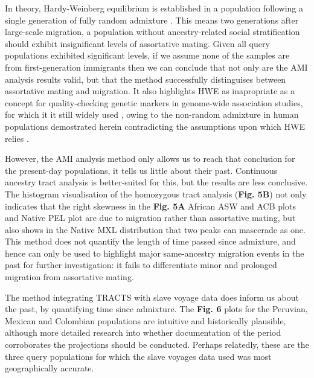 \documentclass[11pt]{article}
\begin{document}
In theory, Hardy-Weinberg equilibrium is established in a population following a single generation of fully random admixture \parencite{Smithjohn2015}. This means two generations after large-scale migration, a population without ancestry-related social stratification should exhibit insignificant levels of assortative mating. Given all query populations exhibited significant levels, if we assume none of the samples are from first-generation immigrants then we can conclude that not only are the AMI analysis results valid, but that the method successfully distinguises between assortative mating and migration. It also highlights HWE as inapropriate as a concept for quality-checking genetic markers in genome-wide association studies, for which it it still widely used \parencite{Linares-Pineda2012}, owing to the non-random admixture in human populations demostrated herein contradicting the assumptions upon which HWE relies \parencite{Smithjohn2015}.

However, the AMI analysis method only allows us to reach that conclusion for the present-day populations, it tells us little about their past. Continuous ancestry tract analysis is better-suited for this, but the results are less conclusive. The histogram visualisation of the homozygous tract analysis (\textbf{Fig. 5B}) not only indicates that the right skewness in the \textbf{Fig. 5A} African ASW and ACB plots and Native PEL plot are due to migration rather than assortative mating, but also shows in the Native MXL distribution that two peaks can mascerade as one. This method does not quantify the length of time passed since admixture, and hence can only be used to highlight major same-ancestry migration events in the past for further investigation: it fails to differentiate minor and prolonged migration from assortative mating. 

The method integrating TRACTS with slave voyage data does inform us about the past, by quantifying time since admixture. The \textbf{Fig. 6} plots for the Peruvian, Mexican and Colombian populations are intuitive and historically plausible, although more detailed research into whether documentation of the period corroborates the projections should be conducted. Perhaps relatedly, these are the three query populations for which the slave voyages data used was most geographically accurate.
\end{document}
